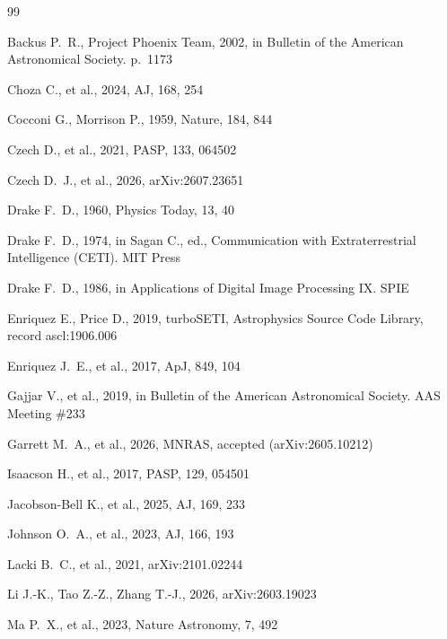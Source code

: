 \documentclass{openjournal}
\begin{document}
\begin{thebibliography}{99}

 Backus P.~R., Project Phoenix Team, 2002, in Bulletin of the American Astronomical Society. p.\ 1173

 Choza C., et al., 2024, AJ, 168, 254

 Cocconi G., Morrison P., 1959, Nature, 184, 844

 Czech D., et al., 2021, PASP, 133, 064502

 Czech D.~J., et al., 2026, arXiv:2607.23651

 Drake F.~D., 1960, Physics Today, 13, 40

 Drake F.~D., 1974, in Sagan C., ed., Communication with Extraterrestrial Intelligence (CETI). MIT Press

 Drake F.~D., 1986, in Applications of Digital Image Processing IX. SPIE

 Enriquez E., Price D., 2019, turboSETI, Astrophysics Source Code Library, record ascl:1906.006

 Enriquez J.~E., et al., 2017, ApJ, 849, 104

 Gajjar V., et al., 2019, in Bulletin of the American Astronomical Society. AAS Meeting \#233

 Garrett M.~A., et al., 2026, MNRAS, accepted (arXiv:2605.10212)

 Isaacson H., et al., 2017, PASP, 129, 054501

 Jacobson-Bell K., et al., 2025, AJ, 169, 233

 Johnson O.~A., et al., 2023, AJ, 166, 193

 Lacki B.~C., et al., 2021, arXiv:2101.02244

 Li J.-K., Tao Z.-Z., Zhang T.-J., 2026, arXiv:2603.19023

 Ma P.~X., et al., 2023, Nature Astronomy, 7, 492


\end{thebibliography}
\end{document}
